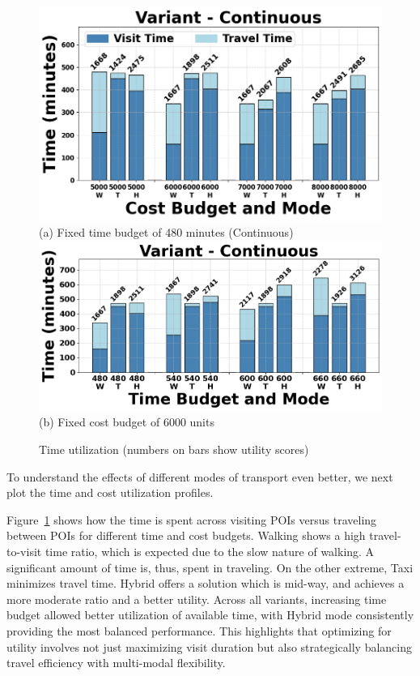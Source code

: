 \begin{figure}[t]
\centering
\includegraphics[width=\columnwidth]{plots/tu1.png}
(a) Fixed time budget of 480 minutes (Continuous)
\includegraphics[width=\columnwidth]{plots/tu2.png}
(b) Fixed cost budget of 6000 units
\caption{Time utilization (numbers on bars show utility scores)}
\label{fig:time-utilization}
\end{figure}

To understand the effects of different modes of transport even better, we next plot the time and cost utilization profiles.

Figure~\ref{fig:time-utilization} shows how the time is spent across visiting POIs versus traveling between POIs for different time and cost budgets.
Walking shows a high travel-to-visit time ratio, which is expected due to the slow nature of walking. A significant amount of time is, thus, spent in traveling. On the other extreme, Taxi minimizes travel time. Hybrid offers a solution which is mid-way, and achieves a more moderate ratio and a better utility.
Across all variants, increasing time budget allowed better utilization of available time, with Hybrid mode consistently providing the most balanced performance. This highlights that optimizing for utility involves not just maximizing visit duration but also strategically balancing travel efficiency with multi-modal flexibility.

